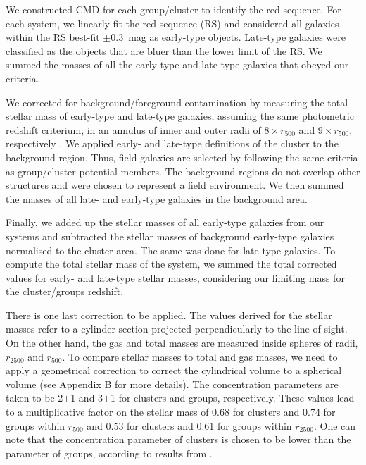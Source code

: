\documentclass{aa}
\begin{document}
We constructed CMD for each group/cluster to identify the
  red-sequence.  For each system, we linearly fit the red-sequence
  (RS) and considered all galaxies within the RS
  best-fit $\pm 0.3$~mag as early-type objects. Late-type galaxies were classified as the
  objects that are bluer than the lower limit of the RS. We summed the
  masses of all the early-type and late-type galaxies that obeyed our
  criteria.

We corrected for background/foreground
  contamination by measuring the total stellar mass of early-type and
  late-type galaxies, assuming the same photometric redshift
  criterium, in an annulus of inner and outer radii of $8 \times r_{500}$ and
  $9 \times r_{500}$, respectively \citep[as already described
  in][]{lms03,lagana08}.  We applied early- and late-type
  definitions of the cluster to the background region.  Thus, field galaxies are
  selected by following the same criteria as group/cluster potential
  members.  The background regions do not overlap other structures and
  were chosen to represent a field environment.  We then summed the
  masses of all late- and early-type galaxies in the background area.


Finally, we added up the stellar masses of all early-type galaxies
  from our systems and subtracted the stellar masses of background
  early-type galaxies normalised to the cluster area.  The same was done
  for late-type galaxies.  To compute the total stellar mass of
  the system, we summed the total corrected values for early- and late-type 
  stellar masses, considering our limiting mass for the cluster/groups redshift.

There is one last correction to be applied. The values derived
  for the stellar masses refer to a cylinder section projected
  perpendicularly to the line of sight. On the other hand, the gas and
  total masses 
  are measured inside spheres of radii, $r_{2500}$ and $r_{500}$.  To
  compare stellar masses to total and gas masses, we need to apply a
  geometrical correction to correct the cylindrical volume to a spherical
  volume (see Appendix B for more details).  The concentration
  parameters are taken to be 2$\pm$1 and 3$\pm$1 for clusters and
  groups, respectively. These values lead to a multiplicative factor
  on the stellar mass of 0.68 for clusters and 0.74 for groups within
  $r_{500}$ and 0.53 for clusters and 0.61 for groups within
  $r_{2500}$.  One can note that the concentration parameter of
  clusters is chosen to be lower than the parameter of groups, according to
  results from \citet{hansen05}.
  
\end{document}
